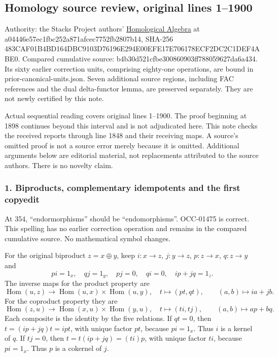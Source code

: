 \subsection{Homology source review, original lines 1--1900}\label{homology-source-review-original-lines-11900}

Authority: the Stacks Project authors' \href{https://github.com/stacks/stacks-project/blob/a04446e57ec1fbc252a871afcec7752fb2807b14/homology.tex}{Homological Algebra} at a04446e57ec1fbc252a871afcec7752fb2807b14, SHA-256 483CAF01B4BD164DBC9103D76196E294E00EFE17E706178ECF2DC2C1DEF4ABE0. Compared cumulative source: b4b30d521cfbe300860903ff788059627da6a434. Its sixty earlier correction units, comprising eighty-one operations, are bound in prior-canonical-units.json. Seven additional source regions, including FAC references and the dual delta-functor lemma, are preserved separately. They are not newly certified by this note.

Actual sequential reading covers original lines 1--1900. The proof beginning at 1898 continues beyond this interval and is not adjudicated here. This note checks the received reports through line 1848 and their receiving maps. A source's omitted proof is not a source error merely because it is omitted. Additional arguments below are editorial material, not replacements attributed to the source authors. There is no novelty claim.

\subsubsection{1. Biproducts, complementary idempotents and the first copyedit}\label{biproducts-complementary-idempotents-and-the-first-copyedit}

At 354, ``endormorphisms'' should be ``endomorphisms''. OCC-01475 is correct. This spelling has no earlier correction operation and remains in the compared cumulative source. No mathematical symbol changes.

For the original biproduct \(z=x\oplus y\), keep \(i:x\to z\), \(j:y\to z\), \(p:z\to x\), \(q:z\to y\) and \[
pi=1_x,\quad qj=1_y,\quad pj=0,\quad qi=0,\quad ip+jq=1_z.
\] The inverse maps for the product property are \[
\operatorname{Hom}(u,z)\longrightarrow
\operatorname{Hom}(u,x)\times\operatorname{Hom}(u,y),\quad
t\longmapsto(pt,qt),\qquad (a,b)\longmapsto ia+jb.
\] For the coproduct property they are \[
\operatorname{Hom}(z,u)\longrightarrow
\operatorname{Hom}(x,u)\times\operatorname{Hom}(y,u),\quad
t\longmapsto(ti,tj),\qquad (a,b)\longmapsto ap+bq.
\] Each composite is the identity by the five relations. If \(qt=0\), then \(t=(ip+jq)t=ipt\), with unique factor \(pt\), because \(pi=1_x\). Thus \(i\) is a kernel of \(q\). If \(tj=0\), then \(t=t(ip+jq)=(ti)p\), with unique factor \(ti\), because \(pi=1_x\). Thus \(p\) is a cokernel of \(j\).

